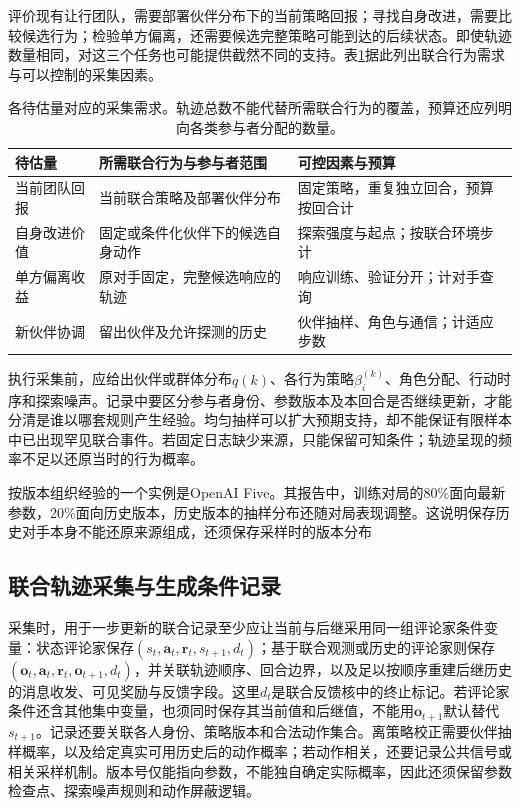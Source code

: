 评价现有让行团队，需要部署伙伴分布下的当前策略回报；寻找自身改进，需要比较候选行为；检验单方偏离，还需要候选完整策略可能到达的后续状态。即使轨迹数量相同，对这三个任务也可能提供截然不同的支持。表\ref{tab:rl-multi-agent-data-needs}据此列出联合行为需求与可以控制的采集因素。

\begin{table}[htbp]
 \centering
 \begin{tabularx}{\linewidth}{@{}l >{\raggedright\arraybackslash}X >{\raggedright\arraybackslash}X@{}}
 \toprule
 待估量 & 所需联合行为与参与者范围 & 可控因素与预算\\
 \midrule
 当前团队回报 & 当前联合策略及部署伙伴分布 & 固定策略，重复独立回合，预算按回合计\\
 自身改进价值 & 固定或条件化伙伴下的候选自身动作 & 探索强度与起点；按联合环境步计\\
 单方偏离收益 & 原对手固定，完整候选响应的轨迹 & 响应训练、验证分开；计对手查询\\
 新伙伴协调 & 留出伙伴及允许探测的历史 & 伙伴抽样、角色与通信；计适应步数\\
 \bottomrule
 \end{tabularx}
 \caption{各待估量对应的采集需求。轨迹总数不能代替所需联合行为的覆盖，预算还应列明向各类参与者分配的数量。}
 \label{tab:rl-multi-agent-data-needs}
\end{table}

执行采集前，应给出伙伴或群体分布$q(k)$、各行为策略$\beta_i^{(k)}$、角色分配、行动时序和探索噪声。记录中要区分参与者身份、参数版本及本回合是否继续更新，才能分清是谁以哪套规则产生经验。均匀抽样可以扩大预期支持，却不能保证有限样本中已出现罕见联合事件。若固定日志缺少来源，只能保留可知条件；轨迹呈现的频率不足以还原当时的行为概率。

按版本组织经验的一个实例是OpenAI Five。其报告中，训练对局的80\%面向最新参数，20\%面向历史版本，历史版本的抽样分布还随对局表现调整。这说明保存历史对手本身不能还原来源组成，还须保存采样时的版本分布

\subsection{联合轨迹采集与生成条件记录}
\label{sec:rl-multi-agent-records}

采集时，用于一步更新的联合记录至少应让当前与后继采用同一组评论家条件变量：状态评论家保存$(s_t,\bm a_t,\bm r_t,s_{t+1},d_t)$；基于联合观测或历史的评论家则保存$(\bm o_t,\bm a_t,\bm r_t,\bm o_{t+1},d_t)$，并关联轨迹顺序、回合边界，以及足以按顺序重建后继历史的消息收发、可见奖励与反馈字段。这里$d_t$是联合反馈核中的终止标记。若评论家条件还含其他集中变量，也须同时保存其当前值和后继值，不能用$\bm o_{t+1}$默认替代$s_{t+1}$。记录还要关联各人身份、策略版本和合法动作集合。离策略校正需要伙伴抽样概率，以及给定真实可用历史后的动作概率；若动作相关，还要记录公共信号或相关采样机制。版本号仅能指向参数，不能独自确定实际概率，因此还须保留参数检查点、探索噪声规则和动作屏蔽逻辑。


